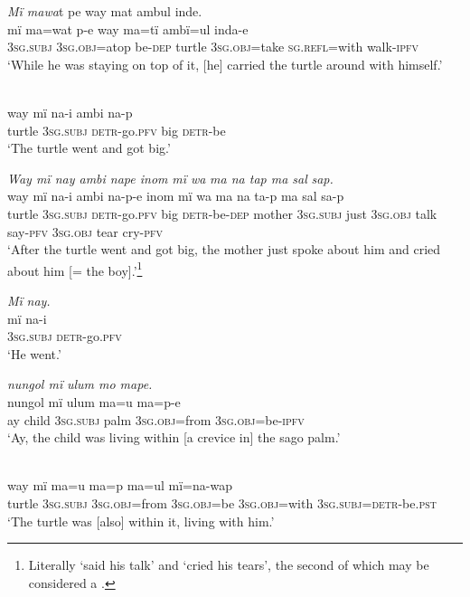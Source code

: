 \ex \textit{Mï maw}{\textit{a}}{t pe way mat ambul inde.}\\
\gll mï      m{a=}w{a}t p{{}-}e    way  ma=tï      ambï{=u}l {i}nda-e\\
3\textsc{sg.subj}  3\textsc{sg.obj}=atop  be-\textsc{dep}  turtle  3\textsc{sg.obj}=take  \textsc{sg.refl}=with walk-\textsc{ipfv}\\
\glt ‘While he was staying on top of it, [he] carried the turtle around with himself.’

\\
\gll way  mï      na-i ambi na-p\\
turtle  3\textsc{sg.subj}  \textsc{detr-}go.\textsc{pfv}  big    \textsc{detr}{}-be\\
\glt ‘The turtle went and got big.’

\ex \textit{Way mï nay ambi nape inom} {\textit{mï wa}} \textit{ma na tap ma sa}{\textit{l}} \textit{sap.}\\
\gll way  mï      na-i ambi na-p-e      inom  mï wa ma      na    ta-p    ma sal sa-p\\
turtle  3\textsc{sg.subj}  \textsc{detr}{}-go.\textsc{pfv}  big    \textsc{detr}{}-be-\textsc{dep}  mother  3\textsc{sg.subj} just  3\textsc{sg.obj}  talk  say-\textsc{pfv}  3\textsc{sg.obj}  tear  cry-\textsc{pfv}\\
\glt ‘After the turtle went and got big, the mother just spoke about him and cried about him [= the boy].’\footnote{Literally ‘said his talk’ and ‘cried his tears’, the second of which may be considered a .}

\ex \textit{M}{\textit{ï}} \textit{nay.}\\
\gll m{ï} na{{}-i}\\
3\textsc{sg.subj}  \textsc{detr}{}-go.\textsc{pfv}\\
\glt ‘He went.’

 \textit{nungol m}{\textit{ï}} \textit{ulum mo mape.}\\
 nungol  m{ï} ulum  m{a=u} ma{=}p{{}-}e\\
ay  child  3\textsc{sg.subj}  palm  3\textsc{sg.obj}=from  3\textsc{sg.obj}=be-\textsc{ipfv}\\
\glt ‘Ay, the child was living within [{a crevice in]} the sago palm.’

\\
\gll way  mï       m{a=u} ma{=}p      m{a=u}l mï{=}na{{}-}wap\\
turtle  3\textsc{sg.subj}  \textsc{3sg.obj=}from  3\textsc{sg.obj}=be  3\textsc{sg.obj}=with 3\textsc{sg.subj}=\textsc{detr}{}-be.\textsc{pst}\\
\glt ‘The turtle was [also] within it, living with him.’

